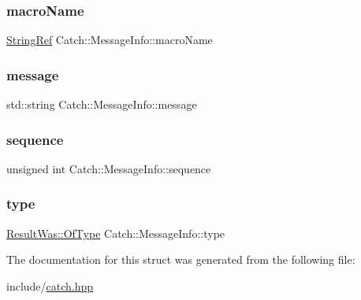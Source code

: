 \subsubsection{\texorpdfstring{macroName}{macroName}}
{\footnotesize\ttfamily \mbox{\hyperlink{class_catch_1_1_string_ref}{String\+Ref}} Catch\+::\+Message\+Info\+::macro\+Name}

\mbox{\label{struct_catch_1_1_message_info_ab6cd06e050bf426c6577502a5c50e256}} 
\subsubsection{\texorpdfstring{message}{message}}
{\footnotesize\ttfamily std\+::string Catch\+::\+Message\+Info\+::message}

\mbox{\label{struct_catch_1_1_message_info_a7f4f57ea21e50160adefce7b68a781d6}} 
\subsubsection{\texorpdfstring{sequence}{sequence}}
{\footnotesize\ttfamily unsigned int Catch\+::\+Message\+Info\+::sequence}

\mbox{\label{struct_catch_1_1_message_info_ae928b9117465c696e45951d9d0284e78}} 
\subsubsection{\texorpdfstring{type}{type}}
{\footnotesize\ttfamily \mbox{\hyperlink{struct_catch_1_1_result_was_a624e1ee3661fcf6094ceef1f654601ef}{Result\+Was\+::\+Of\+Type}} Catch\+::\+Message\+Info\+::type}



The documentation for this struct was generated from the following file\+:\begin{DoxyCompactItemize}
\item 
include/\mbox{\hyperlink{catch_8hpp}{catch.\+hpp}}\end{DoxyCompactItemize}
